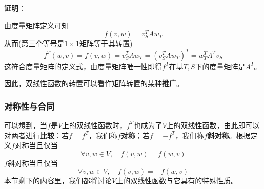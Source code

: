 \documentclass[a4paper,UTF8,fontset=windows,AutoFakeBold]{ctexart}
\newcommand{\proo}[1]{{\vspace{5pt}\kaishu\noindent\textbf{证明}：\vspace{-3pt}
\begin{compactitem}
    \item[] #1
\end{compactitem}
}}
\begin{document}
\proo{
    由度量矩阵定义可知
    $$f(v,w)=v_S^TAw_T$$
    从而(第三个等号是$1\times1$矩阵等于其转置)
    $$f^T(w,v)=f(v,w)=v_S^TAw_T=(v_S^TAw_T)^T=w_T^TA^Tv_S$$
    这符合度量矩阵的定义式，由度量矩阵唯一性即得$f^T$在基$T,S$下的度量矩阵是$A^T$。
}

因此，双线性函数的转置可以看作矩阵转置的某种\textbf{推广}。

\subsubsection{对称性与合同}
可以想到，当$f$是$V$上的双线性函数时，$f^T$也成为了$V$上的双线性函数，由此即可以对两者进行\textbf{比较}：若$f=f^T$，我们称$f$\textbf{对称}；若$f=-f^T$，我们称$f$\textbf{斜对称}。根据定义$f$对称当且仅当
$$\forall v,w\in V,\quad f(v,w)=f(w,v)$$
$f$斜对称当且仅当
$$\forall v,w\in V,\quad f(v,w)=-f(w,v)$$
本节剩下的内容里，我们都将讨论$V$上的双线性函数与它具有的特殊性质。
\end{document}
